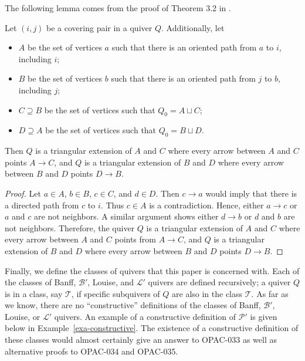 \documentclass[ALCO,Unicode]{cedram}
\newcommand{\BB}{\mathcal{B}}
\newcommand{\PP}{\mathcal{P}}
\newcommand{\LL}{\mathcal{L}}
\begin{document}
The following lemma comes from the proof of Theorem 3.2 in \cite{MR4108215}.

\begin{lemm} \label{lem-covering-pair-triangulation}
    Let $(i,j)$ be a covering pair in a quiver $Q$.
    Additionally, let
    \begin{itemize}
        \item $A$ be the set of vertices $a$ such that there is an oriented path from $a$ to $i$, including $i$;

        \item $B$ be the set of vertices $b$ such that there is an oriented path from $j$ to $b$, including $j$;

        \item $C \supseteq B$ be the set of vertices such that $Q_0 = A \sqcup C$;

        \item $D \supseteq A$ be the set of vertices such that $Q_0 = B \sqcup D$.
    \end{itemize} 
    Then $Q$ is a triangular extension of $A$ and $C$ where every arrow between $A$ and $C$ points $A \to C$, and $Q$ is a triangular extension of $B$ and $D$ where every arrow between $B$ and $D$ points $D \to B$.
\end{lemm}

\begin{proof}
    Let $a \in A$, $b \in B$, $c \in C$, and $d \in D$.
    Then $c \to a$ would imply that there is a directed path from $c$ to $i$.
    Thus $c \in A$ is a contradiction.
    Hence, either $a \to c$ or $a$ and $c$ are not neighbors.
    A similar argument shows either $d \to b$ or $d$ and $b$ are not neighbors.
    Therefore, the quiver $Q$ is a triangular extension of $A$ and $C$ where every arrow between $A$ and $C$ points from $A \to C$, and $Q$ is a triangular extension of $B$ and $D$ where every arrow between $B$ and $D$ points $D \to B$.
\end{proof}

Finally, we define the classes of quivers that this paper is concerned with.
Each of the classes of Banff, $\BB'$, Louise, and $\LL'$ quivers are defined recursively; a quiver $Q$ is in a class, say $\mathcal{T}$, if specific subquivers of $Q$ are also in the class $\mathcal{T}$.
As far as we know, there are no ``constructive'' definitions of the classes of Banff, $\BB'$, Louise, or $\LL'$ quivers. 
An example of a constructive definition of $\PP'$ is given below in Example~\ref{exa-constructive}.
The existence of a constructive definition of these classes would almost certainly give an answer to OPAC-033 as well as alternative proofs to OPAC-034 and OPAC-035.
\end{document}
